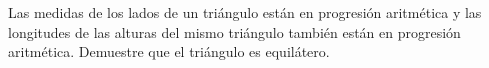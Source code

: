Las medidas de los lados de un triángulo están en progresión aritmética y las longitudes de las alturas del mismo triángulo también están en progresión aritmética.  \newline 
Demuestre que el triángulo es equilátero.